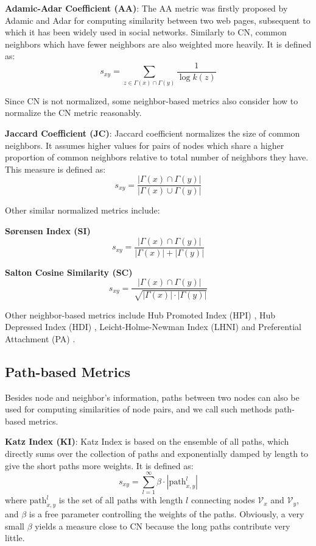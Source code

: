 \documentclass[\main/thesis.tex]{subfiles}
\begin{document}
\textbf{Adamic-Adar Coefficient (AA)}: The AA metric \cite{adamic2003friends} was firstly proposed by Adamic and Adar for computing similarity between two web pages, subsequent to which it has been widely used in social networks. Similarly to CN, common neighbors which have fewer neighbors are also weighted more heavily. It is defined as:
\begin{equation}
s_{xy}=\sum_{z\in \Gamma(x)\cap\Gamma(y)}\frac{1}{\log{k(z)}}
\end{equation}

Since CN is not normalized, some neighbor-based metrics also consider how to normalize the CN metric reasonably.

\textbf{Jaccard Coefficient (JC)}: Jaccard coefficient \cite{jaccard1901etude} normalizes the size of common neighbors. It assumes higher values for pairs of nodes which share a higher proportion of common neighbors relative to total number of neighbors they have. This measure is defined as:
\begin{equation}
s_{xy}=\frac{|\Gamma(x)\cap\Gamma(y)|}{|\Gamma(x)\cup\Gamma(y)|}
\end{equation}

Other similar normalized metrics include:

\textbf{S{\o}rensen Index (SI)} \cite{sorensen1948method}
\begin{equation}
s_{xy}=\frac{|\Gamma(x)\cap\Gamma(y)|}{|\Gamma(x)|+|\Gamma(y)|}
\end{equation}

\textbf{Salton Cosine Similarity (SC)} \cite{salton1986introduction}
\begin{equation}
s_{xy}=\frac{|\Gamma(x)\cap\Gamma(y)|}{\sqrt[]{|\Gamma(x)|\cdot|\Gamma(y)|}}
\end{equation}

Other neighbor-based metrics include Hub Promoted Index (HPI) \cite{ravasz2002hierarchical}, Hub Depressed Index (HDI) \cite{zhou2009predicting}, Leicht-Holme-Newman Index (LHNI) \cite{leicht2006vertex} and Preferential Attachment (PA) \cite{barabasi2002evolution}.
\subsection{Path-based Metrics}
Besides node and neighbor’s information, paths between two nodes can also be used for computing similarities of node pairs, and we call such methods path-based metrics.

\textbf{Katz Index (KI)}: Katz Index \cite{katz1953new} is based on the ensemble of all paths, which directly sums over the collection of paths and exponentially damped by length to give the short paths more weights. It is defined as:
\begin{equation}
s_{xy} = \sum_{l=1}^{\infty}\beta \cdot |\text{path}_{x,y}^{l}|
\end{equation}
where $\text{path}_{x,y}^{l}$ is the set of all paths with length $l$ connecting nodes $\mathcal{V}_x$ and $\mathcal{V}_y$, and $\beta$ is a free parameter controlling the weights of the paths. Obviously, a very small $\beta$ yields a measure close to CN because the long paths contribute very little.
\end{document}
